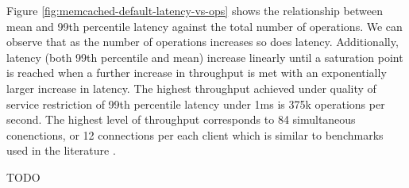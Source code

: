 Figure \ref{fig:memcached-default-latency-vs-ops} shows the relationship between mean and 99th percentile latency against the total number of operations. We can observe that as the number of operations increases so does latency. Additionally, latency (both 99th percentile and mean) increase linearly until a saturation point is reached when a further increase in throughput is met with an exponentially larger increase in latency. The highest throughput achieved under quality of service restriction of 99th percentile latency under 1ms is 375k operations per second. The highest level of throughput corresponds to 84 simultaneous conenctions, or 12 connections per each client which is similar to benchmarks used in the literature \cite{lim2013thin}.

TODO








